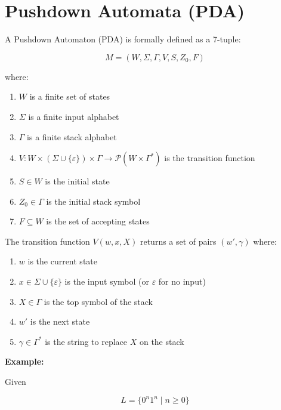 \documentclass[12pt,a4paper,openany]{article}
\begin{document}
\section{Pushdown Automata (PDA)}

A Pushdown Automaton (PDA) is formally defined as a 7-tuple:

\[
M = (W, \Sigma, \Gamma, V, S, Z_0, F)
\]

where:

\begin{enumerate}
    \item $W$ is a finite set of states
    \item $\Sigma$ is a finite input alphabet
    \item $\Gamma$ is a finite stack alphabet
    \item $V: W \times (\Sigma \cup \{\varepsilon\}) \times \Gamma \to \mathcal{P}(W \times \Gamma^*)$ is the transition function
    \item $S \in W$ is the initial state
    \item $Z_0 \in \Gamma$ is the initial stack symbol
    \item $F \subseteq W$ is the set of accepting states
\end{enumerate}

The transition function $V(w, x, X)$ returns a set of pairs $(w', \gamma)$ where:

\begin{enumerate}
    \item $w$ is the current state
    \item $x \in \Sigma \cup \{\varepsilon\}$ is the input symbol (or $\varepsilon$ for no input)
    \item $X \in \Gamma$ is the top symbol of the stack
    \item $w'$ is the next state
    \item $\gamma \in \Gamma^*$ is the string to replace $X$ on the stack
\end{enumerate}

\textbf{Example:} 

Given 

\[L = \{0^n1^n \mid n \geq 0\}\]
\end{document}
